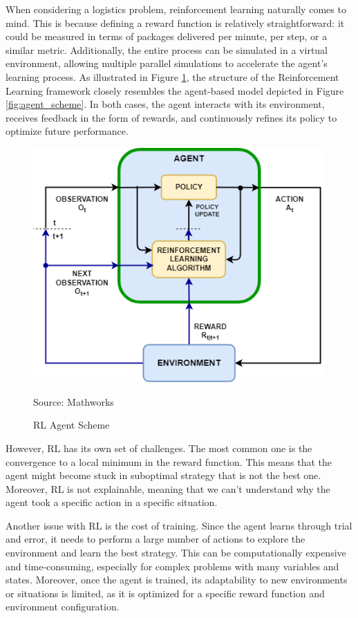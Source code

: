 When considering a logistics problem, reinforcement learning naturally comes to mind.
This is because defining a reward function is relatively straightforward: it could
be measured in terms of packages delivered per minute, per step, or a similar metric.
Additionally, the entire process can be simulated in a virtual environment,
allowing multiple parallel simulations to accelerate the agent's learning
process. As illustrated in Figure \ref{fig:rl_scheme}, the structure of the
Reinforcement Learning framework closely resembles the agent-based model
depicted in Figure \ref{fig:agent_scheme}. In both cases, the agent interacts
with its environment, receives feedback in the form of rewards, and continuously
refines its policy to optimize future performance.

\begin{figure}[h!]
  \centering
  \includegraphics[width=.6\textwidth]{images/rl_scheme.png}
  \caption{RL Agent Scheme}
  {Source: Mathworks\footnotemark} \label{fig:rl_scheme}
\end{figure}

However, RL has its own set of challenges. The most common one is the convergence
to a local minimum in the reward function. This means that the agent might
become stuck in suboptimal strategy that is not the best one. Moreover, RL is
not explainable, meaning that we can't understand why the agent took a specific action
in a specific situation.

Another issue with RL is the cost of training. Since the agent learns through
trial and error, it needs to perform a large number of actions to explore the environment
and learn the best strategy. This can be computationally expensive and time-consuming,
especially for complex problems with many variables and states. Moreover, once the
agent is trained, its adaptability to new environments or situations is limited,
as it is optimized for a specific reward function and environment configuration.


